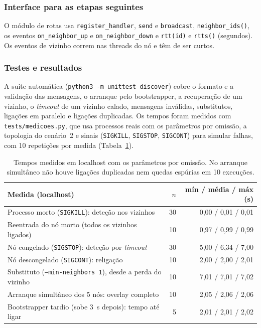 \subsubsection{Interface para as etapas seguintes}

O módulo de rotas usa \texttt{register\_handler}, \texttt{send} e \texttt{broadcast}, 
\texttt{neighbor\_ids()}, os eventos \texttt{on\_neighbor\_up} e \texttt{on\_neighbor\_down}
e \texttt{rtt(id)} e \texttt{rtts()} (segundos). Os eventos de vizinho correm nas threads do nó e têm
de ser curtos.

\subsubsection{Testes e resultados}

A suite automática (\texttt{python3 -m unittest discover}) cobre o formato e a validação das
mensagens, o arranque pelo bootstrapper, a recuperação de um vizinho, o \emph{timeout} de um vizinho
calado, mensagens inválidas, substitutos, ligações em paralelo e ligações duplicadas. Os tempos foram
medidos com \texttt{tests/medicoes.py}, que usa processos reais com os parâmetros por omissão, a
topologia do cenário~2 e sinais (\texttt{SIGKILL}, \texttt{SIGSTOP}, \texttt{SIGCONT}) para simular
falhas, com 10 repetições por medida (Tabela~\ref{tab:e1-tempos}).

\begin{table}[h]
\centering
\small
\begin{tabular}{lrr}
\hline
Medida (localhost) & $n$ & mín / média / máx (s) \\
\hline
Processo morto (\texttt{SIGKILL}): deteção nos vizinhos & 30 & 0,00 / 0,01 / 0,01 \\
Reentrada do nó morto (todos os vizinhos ligados) & 10 & 0,97 / 0,99 / 0,99 \\
Nó congelado (\texttt{SIGSTOP}): deteção por \emph{timeout} & 30 & 5,00 / 6,34 / 7,00 \\
Nó descongelado (\texttt{SIGCONT}): religação & 10 & 2,00 / 2,00 / 2,01 \\
Substituto (\texttt{--min-neighbors 1}), desde a perda do vizinho & 10 & 7,01 / 7,01 / 7,02 \\
Arranque simultâneo dos 5 nós: overlay completo & 10 & 2,05 / 2,06 / 2,06 \\
Bootstrapper tardio (sobe 3~s depois): tempo até ligar & 5 & 2,01 / 2,01 / 2,02 \\
\hline
\end{tabular}
\caption{Tempos medidos em localhost com os parâmetros por omissão. No arranque simultâneo
não houve ligações duplicadas nem quedas espúrias em 10 execuções.}
\label{tab:e1-tempos}
\end{table}

